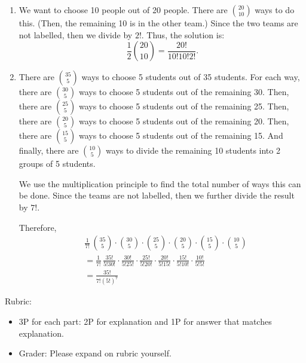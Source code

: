 \documentclass{article}
\theoremstyle{definition}
\begin{document}
\begin{solution}
\begin{enumerate}
        \item We want to choose 10 people out of 20 people.  There are $\binom{20}{10}$ ways to do this.  (Then, the remaining 10 is in the other team.) 
        Since the two teams are not labelled, then we divide by $2!$.  Thus, the solution is:
        \[ \frac{1}{2} \binom{20}{10} = \frac{20!}{10!10!2!}. \]
        
        \item There are $\binom{35}{5}$ ways to choose 5 students out of 35 students.  For each way, there are $\binom{30}{5}$ ways to choose 5 students out of the remaining 30.  Then, there are $\binom{25}{5}$ ways to choose 5 students out of the remaining 25. Then, there are $\binom{20}{5}$ ways to choose 5 students out of the remaining 20. Then, there are $\binom{15}{5}$ ways to choose 5 students out of the remaining 15.  And finally, there are $\binom{10}{5}$ ways to divide the remaining 10 students into 2 groups of 5 students.  

	We use the multiplication principle to find the total number of ways this can be done.  Since the teams are not labelled, then we further divide the result by $7!$.

	Therefore,
	\begin{align*}
    	&\frac{1}{7!} \,\binom{35}{5} \cdot \binom{30}{5} \cdot \binom{25}{5 } \cdot \binom{20}{5} \cdot \binom{15}{5 } \cdot \binom{10}{5} \\
    	&= 
    	\frac{1}{7!} \, \frac{35!}{5!30!} \cdot \frac{30!}{5!25!} \cdot \frac{25!}{5!20!} \cdot \frac{20!}{5!15!} \cdot \frac{15!}{5!10!} \cdot \frac{10!}{5!5!}\\
   	& = \frac{35!}{7!(5!)^7}
	\end{align*}
        
   	\end{enumerate}
 {\color{red} Rubric:
\begin{itemize}
\item 3P for each part: 2P for explanation and 1P for answer that matches explanation.
\item Grader: Please expand on rubric yourself.
\end{itemize}}
\end{solution}
\end{document}
